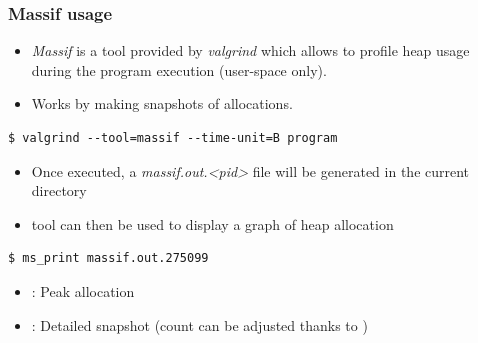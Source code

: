 \begin{frame}[fragile]
  \frametitle{Massif usage}
  \begin{itemize}
    \item {\em Massif} is a tool provided by {\em valgrind} which allows to profile
          heap usage during the program execution (user-space only).
    \item Works by making snapshots of allocations.
  \end{itemize}
  \begin{block}{}
    \begin{verbatim}
$ valgrind --tool=massif --time-unit=B program
    \end{verbatim}
  \end{block}
  \begin{itemize}
    \item Once executed, a {\em massif.out.<pid>} file will be generated in the
          current directory
    \item {} tool can then be used to display a graph of heap allocation
  \end{itemize}

  \begin{block}{}
    \begin{verbatim}
$ ms_print massif.out.275099
    \end{verbatim}
  \end{block}
  \begin{itemize}
    \item \code{#}: Peak allocation
    \item {}: Detailed snapshot (count can be adjusted thanks to
    )
  \end{itemize}
\end{frame}

